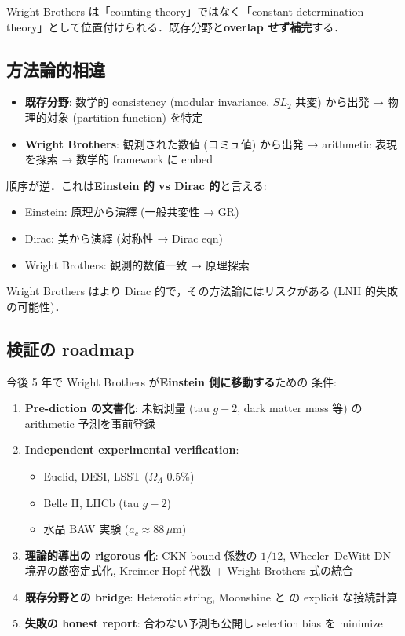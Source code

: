 \documentclass[11pt,a4paper]{article}
\begin{document}
Wright Brothers は「counting theory」ではなく「constant determination
theory」として位置付けられる．既存分野と\textbf{overlap せず補完}する．

\subsection{方法論的相違}

\begin{itemize}
\item \textbf{既存分野}: 数学的 consistency (modular invariance, $SL_2$ 共変)
から出発 → 物理的対象 (partition function) を特定
\item \textbf{Wright Brothers}: 観測された数値 (コミュ値) から出発 →
arithmetic 表現を探索 → 数学的 framework に embed
\end{itemize}

順序が逆．これは\textbf{Einstein 的 vs Dirac 的}と言える:
\begin{itemize}
\item Einstein: 原理から演繹 (一般共変性 → GR)
\item Dirac: 美から演繹 (対称性 → Dirac eqn)
\item Wright Brothers: 観測的数値一致 → 原理探索
\end{itemize}

Wright Brothers はより Dirac 的で，その方法論にはリスクがある
(LNH 的失敗の可能性)．

\subsection{検証の roadmap}

今後 5 年で Wright Brothers が\textbf{Einstein 側に移動する}ための
条件:

\begin{enumerate}
\item \textbf{Pre-diction の文書化}: 未観測量 (tau $g-2$, dark matter
mass 等) の arithmetic 予測を事前登録
\item \textbf{Independent experimental verification}:
\begin{itemize}
\item Euclid, DESI, LSST ($\Omega_\Lambda$ 0.5\%)
\item Belle II, LHCb (tau $g-2$)
\item 水晶 BAW 実験 ($a_c \approx 88\,\mu$m)
\end{itemize}
\item \textbf{理論的導出の rigorous 化}: CKN bound 係数の $1/12$,
Wheeler--DeWitt DN 境界の厳密定式化, Kreimer Hopf 代数 + Wright
Brothers 式の統合
\item \textbf{既存分野との bridge}: Heterotic string, Moonshine と
の explicit な接続計算
\item \textbf{失敗の honest report}: 合わない予測も公開し selection bias
を minimize
\end{enumerate}
\end{document}
